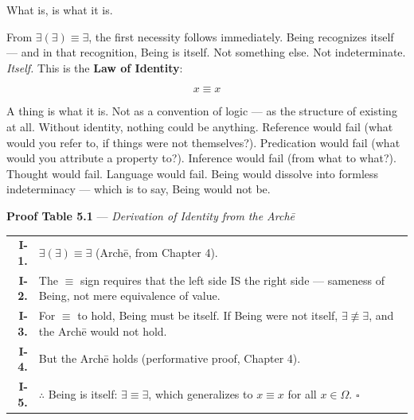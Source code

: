 \documentclass[10pt, openany, oneside]{book}
\renewcommand{\footnotesize}{\fontsize{8.5}{11}\selectfont}
\begin{document}
\vspace{2em}


\noindent What is, is what it is.

From $\exists(\exists) \equiv \exists$, the first necessity follows immediately. Being recognizes itself --- and in that recognition, Being is itself. Not something else. Not indeterminate. \textit{Itself.} This is the \textbf{Law of Identity}:

$$x \equiv x$$

A thing is what it is. Not as a convention of logic --- as the structure of existing at all. Without identity, nothing could be anything. Reference would fail (what would you refer to, if things were not themselves?). Predication would fail (what would you attribute a property to?). Inference would fail (from what to what?). Thought would fail. Language would fail. Being would dissolve into formless indeterminacy --- which is to say, Being would not be.

\vspace{0.5em}

\textbf{Proof Table 5.1} --- \textit{Derivation of Identity from the Arch\={e}}

\vspace{0.5em}

{\footnotesize
\noindent\begin{tabular}{r p{}}
\textbf{I-1.} & $\exists(\exists) \equiv \exists$ (Arch\={e}, from Chapter 4). \\[0.3em]
\textbf{I-2.} & The $\equiv$ sign requires that the left side IS the right side --- sameness of Being, not mere equivalence of value. \\[0.3em]
\textbf{I-3.} & For $\equiv$ to hold, Being must be itself. If Being were not itself, $\exists \not\equiv \exists$, and the Arch\={e} would not hold. \\[0.3em]
\textbf{I-4.} & But the Arch\={e} holds (performative proof, Chapter 4). \\[0.3em]
\textbf{I-5.} & $\therefore$ Being is itself: $\exists \equiv \exists$, which generalizes to $x \equiv x$ for all $x \in \Omega$. $\square$ \\[0.3em]
\end{tabular}
}

\vspace{0.8em}
\end{document}
